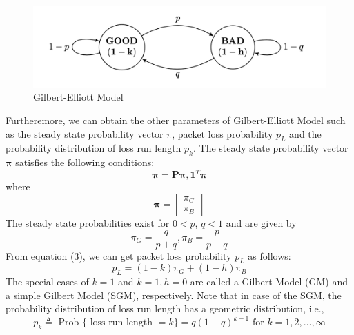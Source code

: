 \documentclass[11pt]{article}
\begin{document}
    \paragraph{}
        \begin{figure}[ht]
        \centering
        \includegraphics[scale=0.5]{figure1.png}
        \caption{Gilbert-Elliott Model}
        \label{fig:label}
    \end{figure}
    Furtheremore, we can obtain the other parameters of Gilbert-Elliott Model such as the steady state probability vector $\pi$, packet loss probability $p_L$ and the probability distribution of loss run length $p_k$.
    The steady state probability vector $\boldsymbol \pi$ satisfies the following conditions:
    \begin{equation}
        \boldsymbol{\pi} = \boldsymbol{P}\boldsymbol{\pi}, \boldsymbol{1}^T\boldsymbol{\pi}
    \end{equation}
    where 
    \begin{equation}
        \boldsymbol{\pi} = \left[
        \begin{array}{c}
            \pi_{G} \\ \pi_{B}
        \end{array}        
        \right]
    \end{equation}
    The steady state probabilities exist for $0<p$, $q<1$ and are given by 
    \begin{equation}
        \pi_G = \frac{q}{p+q},\pi_B = \frac{p}{p+q}
    \end{equation}
    From equation (3), we can get packet loss probability $p_L$ as follows:
    \begin{equation}
        p_L = (1-k)\pi_G + (1-h)\pi_B
    \end{equation}
    The special cases of $k=1$ and $k=1,h=0$ are called a Gilbert Model (GM) and a simple Gilbert Model
(SGM), respectively.
Note that in case of the SGM, the probability distribution of loss run length has a geometric distribution,
i.e.,
\begin{equation}
    p_{k} \triangleq \text { Prob }\{\text { loss run length }=k\}=q(1-q)^{k-1} \text { for } k=1,2, \ldots, \infty
\end{equation}
\end{document}
